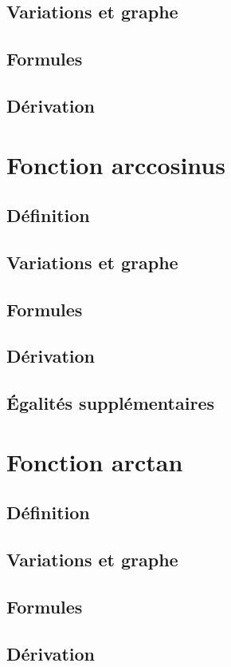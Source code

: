 \documentclass[12pt,a4paper,french]{book}
\begin{document}
		\subsection{Variations et graphe}
		\subsection{Formules}
		\subsection{Dérivation}
	\section{Fonction arccosinus}
		\subsection{Définition}
		\subsection{Variations et graphe}
		\subsection{Formules}
		\subsection{Dérivation}
		\subsection{Égalités supplémentaires}
	\section{Fonction arctan}
		\subsection{Définition}
		\subsection{Variations et graphe}
		\subsection{Formules}
		\subsection{Dérivation}
\end{document}
